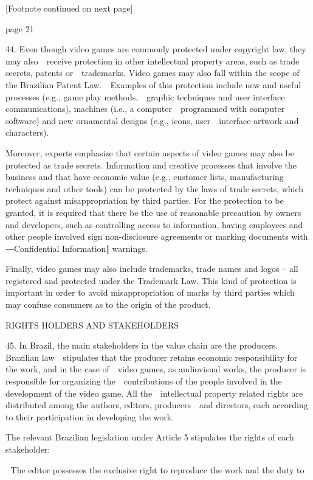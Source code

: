 \documentclass[
]{article}
\begin{document}
{{[}Footnote continued on next page{]}}

{page 21}

{44. }{Even though video games are commonly protected under copyright
law, they may also~~receive protection in other intellectual property
areas, such as trade secrets, patents or~~trademarks. Video games may
also fall within the scope of the Brazilian }{Patent Law}{.~~Examples of
this protection include new and useful processes (e.g., game play
methods,~~graphic techniques and user interface communications),
machines (i.e., a computer~~programmed with computer software) and new
ornamental designs (e.g., icons, user~~interface artwork and
characters).}

{Moreover, experts emphasize that certain aspects of video games may
also be protected as trade secrets. Information and creative processes
that involve the business and that have economic value (e.g., customer
lists, manufacturing techniques and other tools) can be protected by the
laws of trade secrets, which protect against misappropriation by third
parties. For the protection to be granted, it is required that there be
the use of reasonable precaution by owners and developers, such as
controlling access to information, having employees and other people
involved sign non-disclosure agreements or marking }{documents with
―Confidential Information‖ warnings.}

{Finally, video games may also include trademarks, trade names and logos
}{-- }{all registered and protected under the }{Trademark Law}{. This
kind of protection is important in order to avoid misappropriation of
marks by third parties which may confuse consumers as to the origin of
the product.}

{RIGHTS HOLDERS AND STAKEHOLDERS}

{45. }{In Brazil, the main stakeholders in the value chain are the
producers. Brazilian law~~stipulates that the producer retains economic
responsibility for the work, and in the case of~~video games, as
audiovisual works, the producer is responsible for organizing
the~~contributions of the people involved in the development of the
video game. All the~~intellectual property related rights are
distributed among the authors, editors, producers~~and directors, each
according to their participation in developing the work.}

{The relevant Brazilian legislation under Article 5 stipulates the
rights of each stakeholder:}

{ }{The editor possesses the exclusive right to reproduce the work and
the duty to}
\end{document}
